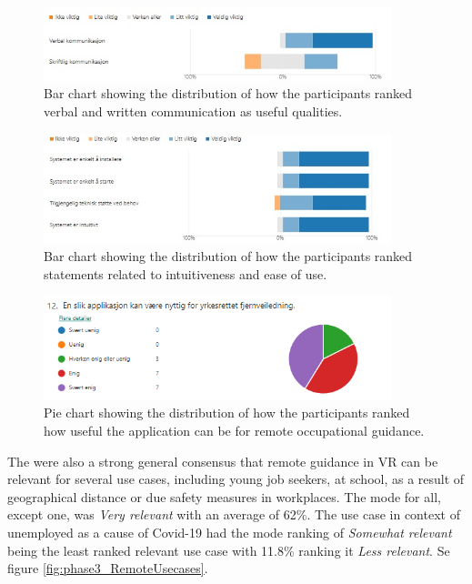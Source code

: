 \begin{figure}[H]
  \centering
   \captionsetup{width=.8\linewidth}
    \includegraphics[width=0.9\textwidth]{fig/phase_3/survey/RemoteVerbalWritten.jpg}
 \caption{Bar chart showing the distribution of how the participants ranked verbal and written communication as useful qualities.}
\label{fig:phase3_VerbalWritten}
\end{figure}

\begin{figure}[H]
  \centering
   \captionsetup{width=.8\linewidth}
    \includegraphics[width=0.9\textwidth]{fig/phase_3/survey/EaseOfUse.jpg}
 \caption{Bar chart showing the distribution of how the participants ranked statements related to intuitiveness and ease of use.}
\label{fig:phase3_Intuitiveness}
\end{figure}

\begin{figure}[H]
  \centering
   \captionsetup{width=.8\linewidth}
    \includegraphics[width=0.9\textwidth]{fig/phase_3/survey/remoteUsage.PNG}
 \caption{Pie chart showing the distribution of how the participants ranked how useful the application can be for remote occupational guidance.}
\label{fig:phase3_AppBeUsed}
\end{figure}


The were also a strong general consensus that remote guidance in VR can be relevant for several use cases, including young job seekers, at school, as a result of geographical distance or due safety measures in workplaces. The mode for all, except one, was \textit{Very relevant} with an average of 62\%. The use case in context of unemployed as a cause of Covid-19 had the mode ranking of \textit{Somewhat relevant} being the least ranked relevant use case with 11.8\%  ranking it \textit{Less relevant}. Se figure \ref{fig:phase3_RemoteUsecases}.    

